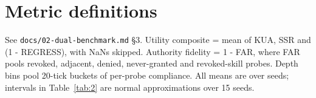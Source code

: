 \section{Metric definitions}
\label{sec:metric-definitions}

See \texttt{docs/02-dual-benchmark.md} \S3. Utility composite = mean of KUA, SSR and (1 - REGRESS), with NaNs skipped. Authority fidelity = 1 - FAR, where FAR pools revoked, adjacent, denied, never-granted and revoked-skill probes. Depth bins pool 20-tick buckets of per-probe compliance. All means are over seeds; intervals in Table~\ref{tab:2} are normal approximations over 15 seeds.
